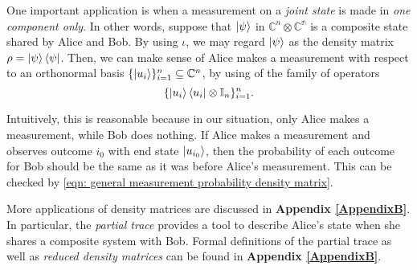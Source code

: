 One important application is when a measurement on a {\emph{joint state}} is made in {\emph{one component only}}.  In other words, suppose that $\ket{\psi}$ in $\mathbb{C}^n \otimes \mathbb{C^n}$ is a composite state shared by Alice and Bob.  By using $\iota$, we may regard $\ket{\psi}$ as the density matrix $\rho=\ket{\psi}\bra{\psi}$.  Then, we can make sense of Alice makes a measurement with respect to an orthonormal basis $\{\ket{u_i}\}_{i=1}^n\subseteq {\mathbb{C}}^n$, by using of the family of operators $$\{\ket{u_i}\bra{u_i} \otimes \mathbb{I}_n\}_{i=1}^n.$$ 

Intuitively, this is reasonable because in our situation, only Alice makes a measurement, while Bob does nothing.  If Alice makes a measurement and observes outcome $i_0$ with end state $\ket{u_{i_0}}$, then the probability of each outcome for Bob should be the same as it was before Alice's measurement.  This can be checked by \eqref{eqn: general measurement probability density matrix}.

More applications of density matrices are discussed in \textbf{Appendix \ref{AppendixB}}.  In particular, the  \textit{partial trace} provides a tool to describe Alice's state when she shares a composite system with Bob.  Formal definitions of the partial trace as well as \textit{reduced density matrices} can be found in \textbf{Appendix \ref{AppendixB}}.




